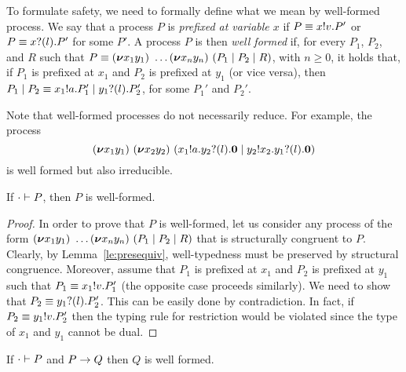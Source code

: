 To formulate safety, we need to formally define what we mean by
well-formed process.  We say that a process \( P \) is \emph{prefixed
  at variable \( x \)} if \( P\equiv x ! v . P' \) or
\( P\equiv x ? (l) . P' \) for some $P'$.
%
A process $P$ is then \emph{well formed} if, for every $P_1$, $P_2$,
and $R$ such that
\( P\equiv (\bm{\nu} x_1y_1)~\dots
  (\bm{\nu} x_ny_n)~(P_1 \mid P_2 \mid R) \), with
\( n \geq 0 \), it holds that, if \( P_1 \) is prefixed at \( x_1 \)
and \( P_2 \) is prefixed at \( y_1 \) (or vice versa), then
\( P_1 \mid P_2
\equiv x_1 ! a . P_1' \mid y_1 ? (l) . P_2' \), for some
$P_1'$ and $P_2'$.

Note that well-formed processes do not necessarily reduce. For example, the process
\begin{equation*}
  (\bm{\nu} x_1y_1)~(\bm{\nu} x_2y_2)~(x_1 ! a . y_2 ? (l) . \bm{0} \mid y_2 ! x_2 . y_1 ? (l) . \bm{0})
\end{equation*}
is well formed but also irreducible.

\begin{theorem}
  If \( \cdot \vdash P \), then \( P \) is well-formed.
\end{theorem}
\begin{proof}
  In order to prove that $P$ is well-formed, let us consider any
  process of the form
  $(\bm{\nu} x_1y_1)~\dots
    (\bm{\nu} x_ny_n)~(P_1 \mid P_2 \mid R)$ that is
  structurally congruent to $P$. Clearly, by Lemma~\ref{le:presequiv},
  well-typedness must be preserved by structural congruence. Moreover,
  assume that $P_1$ is prefixed at $x_1$ and $P_2$ is prefixed at
  $y_1$ such that $P_1 \equiv x_1 ! v . P_1'$ (the opposite
  case proceeds similarly). We need to show that
  $P_2 \equiv y_1 ? (l) . P_2'$. This can be easily done by
  contradiction. In fact, if $P_2 \equiv y_1 ! v . P_2'$ then
  the typing rule for restriction would be violated since the type of
  $x_1$ and $y_1$ cannot be dual.
\end{proof}

\begin{corollary}
  If \( \cdot \vdash P \) and \( P \rightarrow Q \) then \( Q \) is well formed.
\end{corollary}
